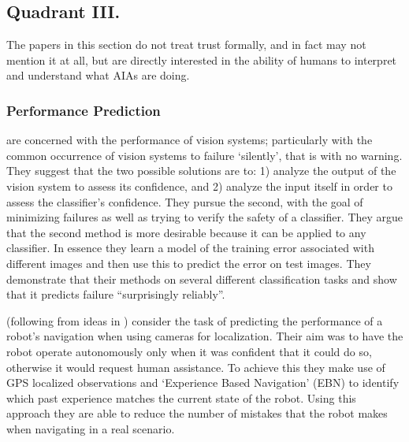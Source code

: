 \subsection{Quadrant III.}\label{sec:q3}
The papers in this section do not treat trust formally, and in fact may not mention it at all, but are directly interested in the ability of humans to interpret and understand what AIAs are doing.

\subsubsection{Performance Prediction}
    \citet{Zhang2014-he} are concerned with the performance of vision systems; particularly with the common occurrence of vision systems to failure `silently', that is with no warning. They suggest that the two possible solutions are to: 1) analyze the output of the vision system to assess its confidence, and 2) analyze the input itself in order to assess the classifier's confidence. They pursue the second, with the goal of minimizing failures as well as trying to verify the safety of a classifier. They argue that the second method is more desirable because it can be applied to any classifier. In essence they learn a model of the training error associated with different images and then use this to predict the error on test images. They demonstrate that their methods on several different classification tasks and show that it predicts failure ``surprisingly reliably''.


    \citet{Gurau2016-hs} (following from ideas in \citet{Churchill2015-ei}) consider the task of predicting the performance of a robot's navigation when using cameras for localization. Their aim was to have the robot operate autonomously only when it was confident that it could do so, otherwise it would request human assistance. To achieve this they make use of GPS localized observations and `Experience Based Navigation' (EBN) to identify which past experience matches the current state of the robot. Using this approach they are able to reduce the number of mistakes that the robot makes when navigating in a real scenario.


